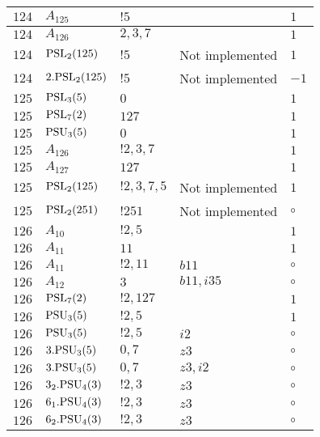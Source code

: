 \documentclass[a4paper, 11pt]{article}
\begin{document}
\begin{longtable}{lllll}
        $ 124 $ & $ A_{125} $ & $ !5 $ & $ ~ $ & $ 1$ \\ \hline
        $ 124 $ & $ A_{126} $ & $ 2, 3, 7 $ & $ ~ $ & $ 1$ \\ \hline
        $ 124 $ & $ {\rm PSL}_{2}(125) $ & $ !5 $ &  Not implemented & $ 1$ \\ \hline
        $ 124 $ & $ 2.{\rm PSL}_{2}(125) $ & $ !5 $ &  Not implemented & $ -1$ \\ \hline
        $ 125 $ & $ {\rm PSL}_{3}(5) $ & $ 0 $ & $ ~ $ & $ 1$ \\ \hline
        $ 125 $ & $ {\rm PSL}_{7}(2) $ & $ 127 $ & $ ~ $ & $ 1$ \\ \hline
        $ 125 $ & $ {\rm PSU}_{3}(5) $ & $ 0 $ & $ ~ $ & $ 1$ \\ \hline
        $ 125 $ & $ A_{126} $ & $ !2, 3, 7 $ & $ ~ $ & $ 1$ \\ \hline
        $ 125 $ & $ A_{127} $ & $ 127 $ & $ ~ $ & $ 1$ \\ \hline
        $ 125 $ & $ {\rm PSL}_{2}(125) $ & $ !2, 3, 7, 5 $ &  Not implemented & $ 1$ \\ \hline
        $ 125 $ & $ {\rm PSL}_{2}(251) $ & $ !251 $ &  Not implemented &  $\circ$ \\ \hline
        $ 126 $ & $ A_{10} $ & $ ! 2,5 $ & $ ~ $ & $ 1$ \\ \hline
        $ 126 $ & $ A_{11} $ & $ 11 $ & $ ~ $ & $ 1$ \\ \hline
        $ 126 $ & $ A_{11} $ & $ ! 2,11 $ & $ b11 $ &  $\circ$ \\ \hline
        $ 126 $ & $ A_{12} $ & $ 3 $ & $ b11,i35 $ &  $\circ$ \\ \hline
        $ 126 $ & $ {\rm PSL}_{7}(2) $ & $ ! 2,127 $ & $ ~ $ & $ 1$ \\ \hline
        $ 126 $ & $ {\rm PSU}_{3}(5) $ & $ ! 2,5 $ & $ ~ $ & $ 1$ \\ \hline
        $ 126 $ & $ {\rm PSU}_{3}(5) $ & $ ! 2,5 $ & $ i2 $ &  $\circ$ \\ \hline
        $ 126 $ & $ 3.{\rm PSU}_{3}(5) $ & $ 0,7 $ & $ z3 $ &  $\circ$ \\ \hline
        $ 126 $ & $ 3.{\rm PSU}_{3}(5) $ & $ 0,7 $ & $ z3, i2 $ &  $\circ$ \\ \hline
        $ 126 $ & $ 3_2.{\rm PSU}_{4}(3) $ & $ ! 2,3 $ & $ z3 $ &  $\circ$ \\ \hline
        $ 126 $ & $ 6_1.{\rm PSU}_{4}(3) $ & $ ! 2,3 $ & $ z3 $ &  $\circ$ \\ \hline
        $ 126 $ & $ 6_2.{\rm PSU}_{4}(3) $ & $ ! 2,3 $ & $ z3 $ &  $\circ$ \\ \hline

\end{longtable}
\end{document}
